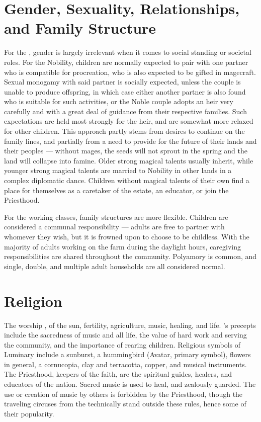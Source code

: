 \documentclass[blue]{GL2020}
\begin{document}
\section*{Gender, Sexuality, Relationships, and Family Structure}
For the \pFarm{}, gender is largely irrelevant when it comes to social standing or societal roles.  For the Nobility, children are normally expected to pair with one partner who is compatible for procreation, who is  also expected to be gifted in magecraft. Sexual monogamy with said partner is socially expected, unless the couple is unable to produce offspring, in which case either another partner is also found who is suitable for such activities, or the Noble couple adopts an heir very carefully and with a great deal of guidance from their respective families. Such expectations are held most strongly for the heir, and are somewhat more relaxed for other children. This approach partly stems from desires to continue on the family lines, and partially from a need to provide for the future of their lands and their peoples — without mages, the seeds will not sprout in the spring and the land will collapse into famine. Older strong magical talents usually inherit, while younger strong magical talents are married to Nobility in other lands in a complex diplomatic dance. Children without magical talents of their own find a place for themselves as a caretaker of the estate, an educator, or join the Priesthood.

For the working classes, family structures are more flexible. Children are considered a communal responsibility — adults are free to partner with whomever they wish, but it is frowned upon to choose to be childless. With the majority of adults working on the farm during the daylight hours, caregiving responsibilities are shared throughout the community. Polyamory is common, and single, double, and multiple adult households are all considered normal.   

\section*{Religion}
The \pFarm{} worship \cFarmGod{}, \cFarmGod{\God} of the sun, fertility, agriculture, music, healing, and life. \cFarmGod{}'s precepts include the sacredness of music and all life, the value of hard work and serving the community, and the importance of rearing children. Religious symbols of Luminary include a sunburst, a hummingbird (Avatar, primary symbol), flowers in general, a cornucopia, clay and terracotta, copper, and musical instruments. The Priesthood, keepers of the faith, are the spiritual guides, healers, and educators of the nation. Sacred music is used to heal, and zealously guarded. The use or creation of music by others is forbidden by the Priesthood, though the traveling circuses from the \pTech{} technically stand outside these rules, hence some of their popularity.
\end{document}
